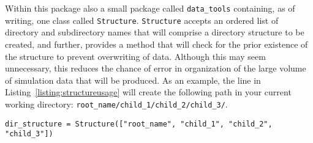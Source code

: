 Within this package also a small package called \texttt{data\_tools} containing,
as of writing, one class called \texttt{Structure}. \texttt{Structure} accepts
an ordered list of directory and subdirectory names that will comprise a
directory structure to be created, and further, provides a method that will
check for the prior existence of the structure to prevent overwriting of data.
Although this may seem unnecessary, this reduces the chance of error in
organization of the large volume of simulation data that will be produced. As an
example, the line in Listing~\ref{listing:structureusage}
will create the following path in your current working directory:
\texttt{root\_name/child\_1/child\_2/child\_3/}.
%
\begin{lstlisting}[caption={\texttt{Structure} usage}, label={listing:structureusage}]
dir_structure = Structure(["root_name", "child_1", "child_2", "child_3"])
\end{lstlisting}
%
